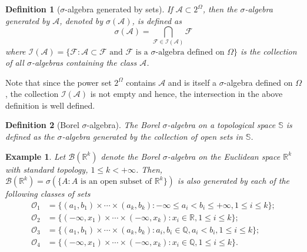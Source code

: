 \documentclass{report}
\newtheorem{definition}{Definition}[section]
\newtheorem{example}{Example}[section]
\theoremstyle{nonumberplain}
\begin{document}
\begin{definition}[$\sigma$-algebra generated by sets]
If $\mathcal{A}\subset2^\Omega$, then the \emph{$\sigma$-algebra generated by} $\mathcal{A}$, denoted by $\sigma(\mathcal{A})$, is defined as
\[
\sigma(\mathcal{A})=\bigcap_{\mathcal{F}\in\mathcal{I}(\mathcal{A})}\mathcal{F}
\]
where $\mathcal{I}(\mathcal{A})=\{\mathcal{F}:\mathcal{A}\subset \mathcal{F}\text{ and }\mathcal{F}\text{ is a }\sigma\text{-algebra defined on }\Omega\}$ is the collection of all $\sigma$-algebras containing the class $\mathcal{A}$.
\end{definition}
Note that since the power set $2^\Omega$ contains $\mathcal{A}$ and is itself a $\sigma$-algebra defined on $\Omega$, the collection $\mathcal{I}(\mathcal{A})$ is not empty and hence, the intersection in the above definition is well defined.

\begin{definition}[Borel $\sigma$-algebra]
	The \emph{Borel $\sigma$-algebra} on a topological space $\mathbb{S}$ is defined as the $\sigma$-algebra	generated by the collection of open sets in $\mathbb{S}$.
\end{definition}


\begin{example}
	Let $\mathcal{B}(\mathbb{R}^k)$ denote the Borel $\sigma$-algebra on the Euclidean space $\mathbb{R}^k$ with standard topology, $1\le k < +\infty$. Then, $\mathcal{B}(\mathbb{R}^k)=\sigma(\{A : A\text{ is an open subset of } \mathbb{R}^k\})$
	is also generated by each of the following classes of sets
	\begin{align*}
	\mathcal{O}_1&=\{(a_1, b_1)\times\cdots\times(a_k,b_k):-\infty\le a_i< b_i\le+\infty,1\le i\le k\};\\
	\mathcal{O}_2&=\{(-\infty, x_1)\times\cdots\times(-\infty,x_k):x_i\in\mathbb{R},1\le i\le k\};\\
	\mathcal{O}_3&=\{(a_1, b_1)\times\cdots\times(a_k,b_k):a_i, b_i\in\mathbb{Q},a_i<b_i,1\le i\le k\};\\
	\mathcal{O}_4&=\{(-\infty, x_1)\times\cdots\times(-\infty,x_k):x_i\in\mathbb{Q},1\le i\le k\}.\\
	\end{align*}
\end{example}
\end{document}
